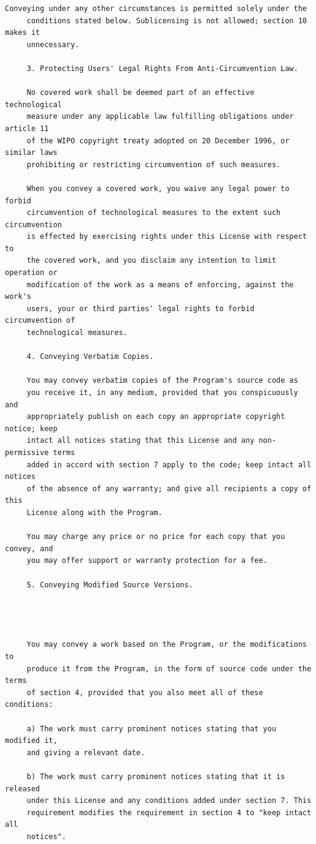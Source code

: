 \begin{lstlisting}[basicstyle=\ttfamily\footnotesize,breaklines=true]
     Conveying under any other circumstances is permitted solely under the
     conditions stated below. Sublicensing is not allowed; section 10 makes it
     unnecessary.

     3. Protecting Users' Legal Rights From Anti-Circumvention Law.

     No covered work shall be deemed part of an effective technological
     measure under any applicable law fulfilling obligations under article 11
     of the WIPO copyright treaty adopted on 20 December 1996, or similar laws
     prohibiting or restricting circumvention of such measures.

     When you convey a covered work, you waive any legal power to forbid
     circumvention of technological measures to the extent such circumvention
     is effected by exercising rights under this License with respect to
     the covered work, and you disclaim any intention to limit operation or
     modification of the work as a means of enforcing, against the work's
     users, your or third parties' legal rights to forbid circumvention of
     technological measures.

     4. Conveying Verbatim Copies.

     You may convey verbatim copies of the Program's source code as
     you receive it, in any medium, provided that you conspicuously and
     appropriately publish on each copy an appropriate copyright notice; keep
     intact all notices stating that this License and any non-permissive terms
     added in accord with section 7 apply to the code; keep intact all notices
     of the absence of any warranty; and give all recipients a copy of this
     License along with the Program.

     You may charge any price or no price for each copy that you convey, and
     you may offer support or warranty protection for a fee.

     5. Conveying Modified Source Versions.




     You may convey a work based on the Program, or the modifications to
     produce it from the Program, in the form of source code under the terms
     of section 4, provided that you also meet all of these conditions:

     a) The work must carry prominent notices stating that you modified it,
     and giving a relevant date.

     b) The work must carry prominent notices stating that it is released
     under this License and any conditions added under section 7. This
     requirement modifies the requirement in section 4 to "keep intact all
     notices".


\end{lstlisting}
